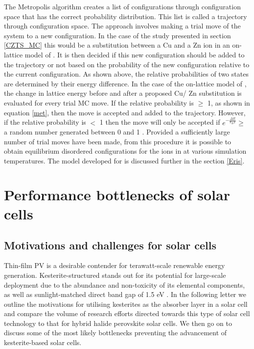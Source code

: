 \documentclass[11pt, twoside]{report}
\begin{document}
The Metropolis algorithm creates a list of configurations through configuration space that has the correct probability distribution. This list is called a trajectory through configuration space. The approach involves making a trial move of the system to a new configuration. In the case of the study presented in section \ref{CZTS_MC} this would be a substitution between a Cu and a Zn ion in an on-lattice model of {\CZTS}. It is then decided if this new configuration should be added to the trajectory or not based on the probability of the new configuration relative to the current configuration. As shown above, the relative probabilities of two states are determined by their energy difference. In the case of the on-lattice model of {\CZTS}, the change in lattice energy before and after a proposed Cu/ Zn substitution is evaluated for every trial MC move. If the relative probability is  $\geq$ 1, as shown in equation \ref{met}, then the move is accepted and added to the trajectory. However, if the relative probability is $<$ 1 then the move will only be accepted if $e^{-\frac{\Delta E}{k_BT}} \ge$ a random number generated between 0 and 1 \cite{Lesar3}. Provided a sufficiently large number of trial moves have been made, from this procedure it is possible to obtain equilibrium disordered configurations for the ions in {\CZTS} at various simulation temperatures. The model developed for {\CZTS} is discussed further in the section \ref{Eris}.


 





\chapter{Performance bottlenecks of {\CZTS} solar cells}\label{chap:CZTS}
\section{Motivations and challenges for {\CZTS} solar cells}
Thin-film PV is a desirable contender for terawatt-scale renewable energy generation. Kesterite-structured {\CZTS} stands out for its potential for large-scale deployment due to the abundance and non-toxicity of its elemental components, as well as sunlight-matched direct band gap of 1.5 eV \cite{CZTS_rev}. In the following letter we outline the motivations for utilising kesterites as the absorber layer in a solar cell and compare the volume of research efforts directed towards this type of solar cell technology to that for hybrid halide perovskite solar cells. We then go on to discuss some of the most likely bottlenecks preventing the advancement of kesterite-based solar cells.
\end{document}
